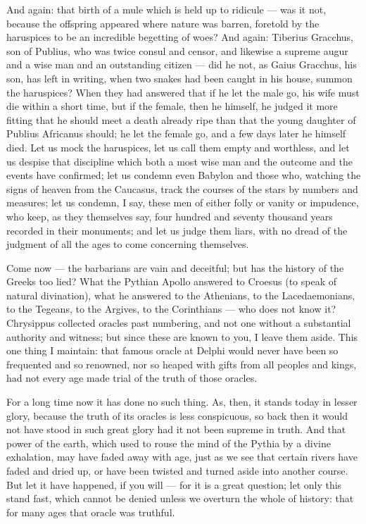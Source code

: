  And again: that birth of a mule which is held up to ridicule — was it not, because the offspring appeared where nature was barren, foretold by the haruspices to be an incredible begetting of woes? And again: Tiberius Gracchus, son of Publius, who was twice consul and censor, and likewise a supreme augur and a wise man and an outstanding citizen — did he not, as Gaius Gracchus, his son, has left in writing, when two snakes had been caught in his house, summon the haruspices? When they had answered that if he let the male go, his wife must die within a short time, but if the female, then he himself, he judged it more fitting that he should meet a death already ripe than that the young daughter of Publius Africanus should; he let the female go, and a few days later he himself died. Let us mock the haruspices, let us call them empty and worthless, and let us despise that discipline which both a most wise man and the outcome and the events have confirmed; let us condemn even Babylon and those who, watching the signs of heaven from the Caucasus, track the courses of the stars by numbers and measures; let us condemn, I say, these men of either folly or vanity or impudence, who keep, as they themselves say, four hundred and seventy thousand years recorded in their monuments; and let us judge them liars, with no dread of the judgment of all the ages to come concerning themselves.

 Come now — the barbarians are vain and deceitful; but has the history of the Greeks too lied? What the Pythian Apollo answered to Croesus (to speak of natural divination), what he answered to the Athenians, to the Lacedaemonians, to the Tegeans, to the Argives, to the Corinthians — who does not know it? Chrysippus collected oracles past numbering, and not one without a substantial authority and witness; but since these are known to you, I leave them aside. This one thing I maintain: that famous oracle at Delphi would never have been so frequented and so renowned, nor so heaped with gifts from all peoples and kings, had not every age made trial of the truth of those oracles.

 For a long time now it has done no such thing. As, then, it stands today in lesser glory, because the truth of its oracles is less conspicuous, so back then it would not have stood in such great glory had it not been supreme in truth. And that power of the earth, which used to rouse the mind of the Pythia by a divine exhalation, may have faded away with age, just as we see that certain rivers have faded and dried up, or have been twisted and turned aside into another course. But let it have happened, if you will — for it is a great question; let only this stand fast, which cannot be denied unless we overturn the whole of history: that for many ages that oracle was truthful.

